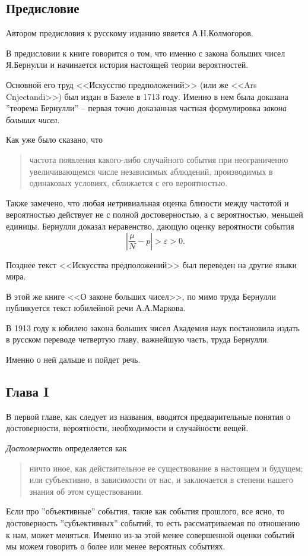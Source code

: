 \documentclass[12pt]{article}
\begin{document}
\subsection{Предисловие}
Автором предисловия к русскому изданию явяется А.Н.Колмогоров.

В предисловии к книге говорится о том, что именно с закона больших чисел Я.Бернулли и начинается история настоящей теории вероятностей.

Основной его труд <<Искусство предположений>> (или же <<Ars Cnjectandi>>) был издан в Базеле в 1713 году.
Именно в нем была доказана ''теорема Бернулли'' -- первая точно доказанная частная формулировка \textit{закона больших чисел}.

Как уже было сказано, что 
\begin{quote}
	частота появления какого-либо случайного события при неограниченно увеличивающемся числе независимых аблюдений, производимых в одинаковых условиях, сближается с его вероятностью.
\end{quote}
Также замечено, что любая нетривиальная оценка близости между частотой и вероятностью действует не с полной достоверностью, а с вероятностью, меньшей единицы.
Бернулли доказал неравенство, дающую оценку вероятности события
$$\left| \frac{\mu}{N} - p \right| > \varepsilon > 0.$$

Позднее текст <<Искусства предположений>> был переведен на другие языки мира.

В этой же книге <<О законе больших чисел>>, по мимо труда Бернулли публикуется текст юбилейной речи А.А.Маркова.

В 1913 году к юбилею закона больших чисел Академия наук постановила издать в русском переводе четвертую главу, важнейшую часть, труда Бернулли.

Именно о ней дальше и пойдет речь.

\newpage
\subsection{Глава I}
В первой главе, как следует из названия, вводятся предварительные понятия о достоверности, вероятности, необходимости и случайности вещей.

\textit{Достоверность} определяется как 
\begin{quote}
ничто иное, как действительное ее существование в настоящем и будущем; или субъективно, в зависимости от нас, и заключается в степени нашего знания об этом существовании.
\end{quote}
Если про ''объективные'' события, такие как события прошлого, все ясно, то достоверность ''субъективных'' событий, то есть рассматриваемая по отношению к нам, может меняться.
Именно из-за этой менее совершенной оценки событий мы можем говорить о более или менее вероятных событиях.
\end{document}

